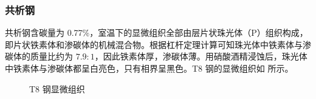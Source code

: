 \documentclass[a4paper,utf8]{article}
\begin{document}
    \subsubsection{共析钢}
    共析钢含碳量为 0.77\%，室温下的显微组织全部由层片状珠光体（P）组织构成，即片状铁素体和渗碳体的机械混合物。根据杠杆定理计算可知珠光体中铁素体与渗碳体的质量比约为 $7.9:1$，因此铁素体厚，渗碳体薄。用硝酸酒精浸蚀后，珠光体中铁素体与渗碳体都呈白亮色，只有相界呈黑色。T8 钢的显微组织如 所示。
    \begin{figure}[!ht]
        \hspace{20pt}
        \hspace{20pt}
        \caption{T8 钢显微组织\label{fig:n3}}
    \end{figure}
\end{document}
